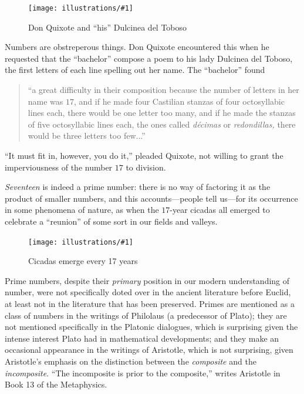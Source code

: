 \documentclass[openany]{book}
\newcommand{\ill}[3]{%
   \begin{figure}[H]%
   \vspace{-2ex}
   \centering%
   \texttt{[image: illustrations/\#1]}%
   \caption{#3}%
   \vspace{-2ex}
    \end{figure}}
\theoremstyle{plain}
\theoremstyle{definition}
\begin{document}



\ill{dulcinea1}{.2}{Don Quixote and ``his'' Dulcinea del Toboso}

Numbers are obstreperous things. Don Quixote encountered this when he
requested that the ``bachelor'' compose a poem to his lady Dulcinea del
Toboso, the first letters of each line spelling out her name. The
``bachelor'' found




\begin{quote}
  ``a great difficulty in their composition because the number of
  letters in her name was $17$, and if he made four Castilian stanzas
  of four octosyllabic lines each, there would be one letter too many,
  and if he made the stanzas of five octosyllabic lines each, the ones
  called {\em d{\'e}cimas} or {\em redondillas,} there would be three
  letters too few...'' 
\end{quote}
  
``It must fit in, however, you do it,'' pleaded Quixote, not willing to
grant the imperviousness of the number $17$ to division.





{\em Seventeen} is indeed a prime number: there is no way of factoring
it as the product of smaller numbers, and this accounts---people tell
us---for its occurrence in some phenomena of nature, as when
the $17$-year cicadas all emerged to celebrate a ``reunion'' of some
sort in our fields and valleys.

\ill{cicada}{.3}{Cicadas emerge every 17 years}




Prime numbers, despite their {\em primary} position in our modern
understanding of number, were not specifically doted over in the
ancient literature before Euclid, at least not in the literature that
has been preserved. Primes are mentioned as a class of numbers in the
writings of Philolaus (a predecessor of Plato); they are not mentioned
specifically in the Platonic dialogues, which is surprising 
given the intense interest Plato had in mathematical developments; and
they make an occasional appearance in the writings of Aristotle, which
is not surprising, given Aristotle's emphasis on the distinction
between the {\em composite} and the {\em incomposite}. ``The
incomposite is prior to the composite,'' writes Aristotle in Book 13 of
the Metaphysics.
\end{document}
